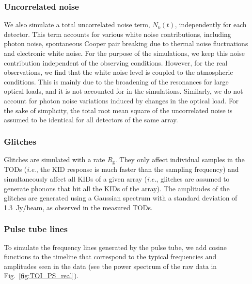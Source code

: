  \subsubsection{Uncorrelated noise}
 \label{sec:white_simu}
We also simulate a total uncorrelated noise term, $N_k(t)$, independently for each detector. This term accounts for various white noise contributions, including  photon noise, spontaneous Cooper pair breaking due to thermal noise fluctuations and electronic white noise. For the purpose of the simulations, we keep this noise contribution independent of the observing conditions. However, for the real observations, we find that the white noise level is coupled to the atmospheric conditions. This is mainly due to the broadening of the resonances for large optical loads, and it is not accounted for in the simulations. Similarly, we do not account for photon noise variations induced by changes in the optical load. For the sake of simplicity, the total root mean square of the uncorrelated noise is assumed to be identical for all detectors of the same array.
	
\subsubsection{Glitches}
\label{sec:glitch_simu}
Glitches are simulated with a rate $R_{\mathrm{g}}$. They only affect individual samples in the TODs ({\it i.e.}, the KID response is much faster than the sampling frequency) and simultaneously affect all KIDs of a given array ({\it i.e.}, glitches are assumed to generate phonons that hit all the KIDs of the array). The amplitudes of the glitches are generated using a Gaussian spectrum with a standard deviation of 1.3~Jy/beam, as observed in the measured TODs.
		
  \subsubsection{Pulse tube lines}
 \label{sec:ptl_simu}
To simulate the frequency lines generated by the pulse tube, we add cosine functions to the timeline that correspond to the typical frequencies and amplitudes seen in the data (see the power spectrum of the raw data in Fig.~\ref{fig:TOI_PS_real}).
   
